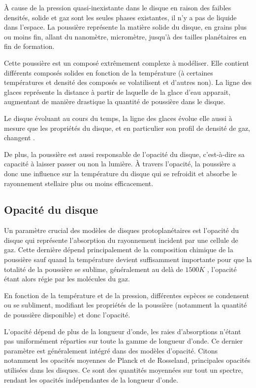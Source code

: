 À cause de la pression quasi-inexistante dans le disque en raison des faibles densités, solide et gaz sont les seules phases
existantes, il n'y a pas de liquide dans l'espace. La poussière représente la matière solide du disque, en grains plus ou moins
fin, allant du nanomètre, micromètre, jusqu'à des tailles planétaires en fin de formation. 

Cette poussière est un composé extrêmement complexe à modéliser. Elle contient différents composés solides en fonction de la température (à certaines températures et densité des composés se volatilisent et d'autres non). La ligne des glaces représente la distance à partir de laquelle de la glace d'eau apparait, augmentant de manière drastique la quantité de poussière dans le disque. 

Le disque évoluant au cours du temps, la ligne des glaces évolue elle aussi à mesure que les propriétés du disque, et en
particulier son profil de densité de gaz, changent \citep{dodsonrobinson2009icelines}.

\bigskip

De plus, la poussière est aussi responsable de l'opacité du disque, c'est-à-dire sa capacité à laisser passer ou non la lumière.
À travers l'opacité, la poussière a donc une influence sur la température du disque qui se refroidit et absorbe le rayonnement
stellaire plus ou moins efficacement. 

\subsection{Opacité du disque}\label{sec:opacity}
Un paramètre crucial des modèles de disques protoplanétaires est l'opacité du disque qui représente l'absorption du rayonnement incident par une cellule de gaz. Cette dernière dépend principalement de la composition chimique de la poussière sauf quand la température devient suffisamment importante pour que la totalité de la poussière se sublime, généralement au delà de $1500\unit{K}$ \citep{pollack1994composition}, l'opacité étant alors régie par les molécules du gaz.

En fonction de la température et de la pression, différentes espèces se condensent ou se subliment, modifiant les propriétés de la poussière (notamment la quantité de poussière disponible) et donc l'opacité.

L'opacité dépend de plus de la longueur d'onde, les raies d'absorptions n'étant pas uniformément réparties sur toute la gamme de longueur d'onde. Ce dernier paramètre est généralement intégré dans des modèles d'opacité. Citons notamment les opacités moyennes de Planck et de Rosseland, principales opacités utilisées dans les disques. Ce sont des quantités moyennées sur tout un spectre, rendant les opacités indépendantes de la longueur d'onde. 

